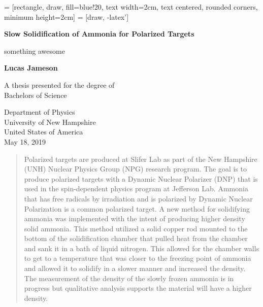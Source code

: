 \documentclass[12pt,notitlepage]{amsart}
\begin{document}
\onehalfspacing
   = [rectangle, draw, fill=blue!20, 
    text width=2cm, text centered, rounded corners, minimum height=2cm]
 = [draw, -latex']


 \begin{titlepage}
   \begin{center}
       \vspace*{1cm}
 
       \textbf{Slow Solidification of Ammonia for Polarized Targets}
 
       \vspace{0.5cm}
        something awesome
 
       \vspace{1.5cm}
 
       \textbf{Lucas Jameson}
 
       \vfill
 
       A thesis presented for the degree of\\
       Bachelors of Science
 
       \vspace{0.8cm}
 
 
       Department of Physics\\
	   University of New Hampshire\\
       United States of America\\
       May 18, 2019
 
   \end{center}
\end{titlepage}
\newpage
\begin{abstract}
Polarized targets are produced at Slifer Lab as part of the New Hampshire (UNH) Nuclear Physics Group (NPG)  research program. The goal is to produce polarized targets with a Dynamic Nuclear Polarizer (DNP) that is used in the spin-dependent physics program at Jefferson Lab. Ammonia that has free radicals by irradiation and is polarized by Dynamic Nuclear Polarization is a common polarized target. A new method for solidifying ammonia was implemented with the intent of producing higher density solid ammonia. This method utilized a solid copper rod mounted to the bottom of the solidification chamber that pulled heat from the chamber and sank it in a bath of liquid nitrogen. This allowed for the chamber walls to get to a temperature that was closer to the freezing point of ammonia and allowed it to solidify in a slower manner and increased the density. The measurement of the density of the slowly frozen ammonia is in progress but qualitative analysis supports the material will have a higher density. 
\end{abstract}
\end{document}
